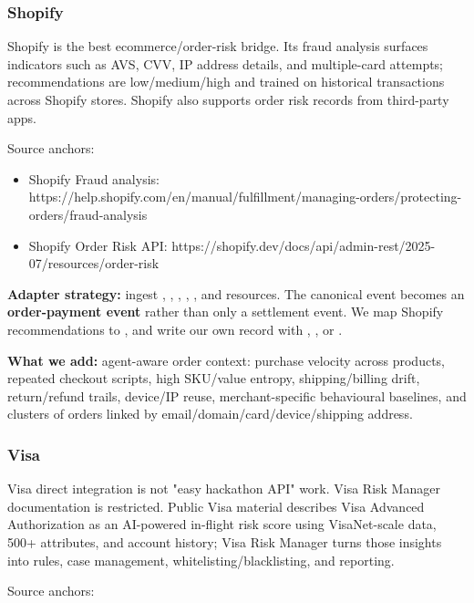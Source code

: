 \documentclass[11pt]{article}
\begin{document}
\subsubsection*{Shopify}
Shopify is the best ecommerce/order-risk bridge. Its fraud analysis surfaces indicators such as AVS, CVV, IP address details, and multiple-card attempts; recommendations are low/medium/high and trained on historical transactions across Shopify stores. Shopify also supports order risk records from third-party apps.

Source anchors:

\begin{itemize}
  \item Shopify Fraud analysis: https://help.shopify.com/en/manual/fulfillment/managing-orders/protecting-orders/fraud-analysis
  \item Shopify Order Risk API: https://shopify.dev/docs/api/admin-rest/2025-07/resources/order-risk
\end{itemize}
\textbf{Adapter strategy:} ingest , , , , , and  resources. The canonical event becomes an \textbf{order-payment event} rather than only a settlement event. We map Shopify recommendations to , and write our own  record with , , or .

\textbf{What we add:} agent-aware order context: purchase velocity across products, repeated checkout scripts, high SKU/value entropy, shipping/billing drift, return/refund trails, device/IP reuse, merchant-specific behavioural baselines, and clusters of orders linked by email/domain/card/device/shipping address.

\subsubsection*{Visa}
Visa direct integration is not "easy hackathon API" work. Visa Risk Manager documentation is restricted. Public Visa material describes Visa Advanced Authorization as an AI-powered in-flight risk score using VisaNet-scale data, 500+ attributes, and account history; Visa Risk Manager turns those insights into rules, case management, whitelisting/blacklisting, and reporting.

Source anchors:
\end{document}
